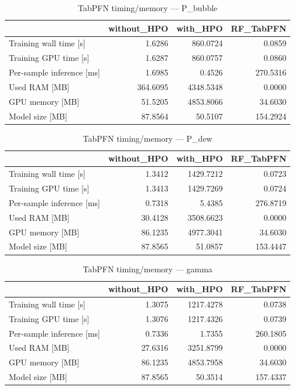 \begin{table}
\caption{TabPFN timing/memory --- P_bubble}
\label{tab:timing_P_bubble}
\begin{tabular}{lrrr}
\toprule
 & without_HPO & with_HPO & RF_TabPFN \\
\midrule
Training wall time [s] & 1.6286 & 860.0724 & 0.0859 \\
Training GPU time [s] & 1.6287 & 860.0757 & 0.0860 \\
Per-sample inference [ms] & 1.6985 & 0.4526 & 270.5316 \\
Used RAM [MB] & 364.6095 & 4348.5348 & 0.0000 \\
GPU memory [MB] & 51.5205 & 4853.8066 & 34.6030 \\
Model size [MB] & 87.8564 & 50.5107 & 154.2924 \\
\bottomrule
\end{tabular}
\end{table}

\begin{table}
\caption{TabPFN timing/memory --- P_dew}
\label{tab:timing_P_dew}
\begin{tabular}{lrrr}
\toprule
 & without_HPO & with_HPO & RF_TabPFN \\
\midrule
Training wall time [s] & 1.3412 & 1429.7212 & 0.0723 \\
Training GPU time [s] & 1.3413 & 1429.7269 & 0.0724 \\
Per-sample inference [ms] & 0.7318 & 5.4385 & 276.8719 \\
Used RAM [MB] & 30.4128 & 3508.6623 & 0.0000 \\
GPU memory [MB] & 86.1235 & 4977.3041 & 34.6030 \\
Model size [MB] & 87.8565 & 51.0857 & 153.4447 \\
\bottomrule
\end{tabular}
\end{table}

\begin{table}
\caption{TabPFN timing/memory --- gamma}
\label{tab:timing_gamma}
\begin{tabular}{lrrr}
\toprule
 & without_HPO & with_HPO & RF_TabPFN \\
\midrule
Training wall time [s] & 1.3075 & 1217.4278 & 0.0738 \\
Training GPU time [s] & 1.3076 & 1217.4326 & 0.0739 \\
Per-sample inference [ms] & 0.7336 & 1.7355 & 260.1805 \\
Used RAM [MB] & 27.6316 & 3251.8799 & 0.0000 \\
GPU memory [MB] & 86.1235 & 4853.7958 & 34.6030 \\
Model size [MB] & 87.8565 & 50.3514 & 157.4337 \\
\bottomrule
\end{tabular}
\end{table}

